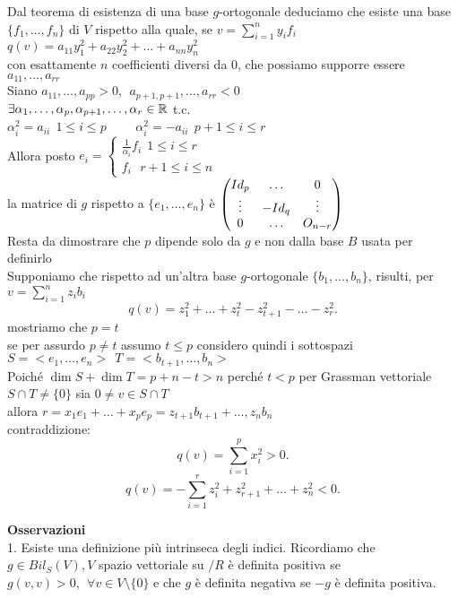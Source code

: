 \documentclass[12px]{article}
\begin{document}
 \begin{dimo}
	 Dal teorema di esistenza di una base $g$-ortogonale deduciamo che esiste una base $\{ f_1,\ldots,f_n\}$ di $V$ rispetto alla quale, se $v = \sum^n_{i=1}y_if_i$\\
	 $q(v) = a_{11}y_1^2 + a_{22}y_2^2+\ldots+a_{nn}y^2_n$\\
	 con esattamente $n$ coefficienti diversi da $0$, che possiamo supporre essere $a_{11},\ldots,a_{rr}$\\
	 Siano $a_{11},\ldots,a_{pp}>0, \ \ a_{p+1,p+1},\ldots,a_{rr}<0$\\
	 $\exists \alpha_1,\ldots, \alpha_p, \alpha_{p+1},\ldots,\alpha_r\in \mathbb{R}$ t.c. \\$\alpha_i^2=a_{ii} \ \ 1\leq i\leq p$  \ \ \  \ $\alpha^2_i  = - a_{ii} \ \ p+1\leq i\leq r$ \\
	 Allora posto $e_i = \begin{cases}
		 \frac{1}{\alpha_i}f_i \ \ 1\leq i\leq r\\
		 f_i \ \ \ r+1\leq i\leq n
	 \end{cases}$\\
	 la matrice di $g$ rispetto a $\{e_1,\ldots,e_n\}$ è $
\begin{pmatrix}Id_p & \ldots & 0\\
			\vdots & -Id_q & \vdots\\
		0 & \ldots & O_{n-r}\end{pmatrix}$\\
		Resta da dimostrare che $p$ dipende solo da $g$ e non dalla base $B$ usata per definirlo\\
		Supponiamo che rispetto ad un'altra base $g$-ortogonale $\{b_1,\ldots,b_n\}$, risulti, per $v= \sum^n_{i=1}z_ib_i$ \\
		\[
			q(v)= z_1^2 + \ldots + z_t^2 - z^2_{t+1} - \ldots - z_r^2
		.\] 
		mostriamo che $p=t$\\
	se per assurdo  $p\neq t$ assumo $t\leq p$ considero quindi i sottospazi  $S = < e_1,\ldots,e_n> \ \ T = <b_{t+1},\ldots,b_n>$\\
	Poiché $\dim S+\dim T = p+n-t>n$ perché $t<p$ per Grassman vettoriale $S\cap T\neq \{0\}$ sia $0\neq v\in S\cap T$\\
	allora  $r = x_1e_1+\ldots+x_pe_p = z_{t+1}b_{t+1}+\ldots,z_nb_n$\\
	contraddizione:
	\[
	q(v)= \sum^p_{i=1}x_i^2 >0
	.\] 
	\[
		q(v) =- \sum^r_{i=1}z_i^2 + z_{r+1}^2 + \ldots + z_n^2 <0
	.\] 
 \end{dimo}
	\textbf{Osservazioni}\\
	1. Esiste una definizione più intrinseca degli indici. Ricordiamo che $g\in Bil_S(V), V$ spazio vettoriale su $/R$ è definita positiva se $g(v,v) >0, \ \ \forall v\in V\setminus\{0\}$ e che  $g$ è definita negativa se $-g$ è definita positiva.\\
\end{document}
